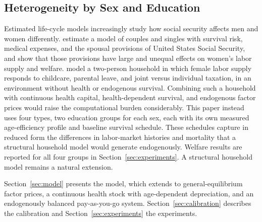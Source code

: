 \subsection{Heterogeneity by Sex and Education}
\label{subsec:lit_gender}

Estimated life-cycle models increasingly study how social security affects men and women differently. \citet{BorellaDeNardiYang2023} estimate a model of couples and singles with survival risk, medical expenses, and the spousal provisions of United States Social Security, and show that those provisions have large and unequal effects on women's labor supply and welfare. \citet{FehrKindermann2018} model a two-person household in which female labor supply responds to childcare, parental leave, and joint versus individual taxation, in an environment without health or endogenous survival. Combining such a household with continuous health capital, health-dependent survival, and endogenous factor prices would raise the computational burden considerably. This paper instead uses four types, two education groups for each sex, each with its own measured age-efficiency profile and baseline survival schedule. These schedules capture in reduced form the differences in labor-market histories and mortality that a structural household model would generate endogenously. Welfare results are reported for all four groups in Section~\ref{sec:experiments}. A structural household model remains a natural extension.

\bigskip
Section~\ref{sec:model} presents the model, which extends \citet{CortesEtAl2024} to general-equilibrium factor prices, a continuous health stock with age-dependent depreciation, and an endogenously balanced pay-as-you-go system. Section~\ref{sec:calibration} describes the calibration and Section~\ref{sec:experiments} the experiments.

